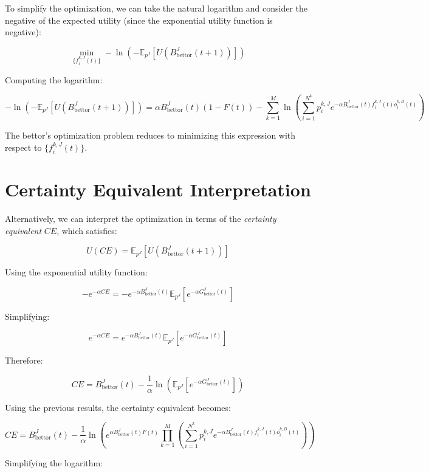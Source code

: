 To simplify the optimization, we can take the natural logarithm and consider the negative of the expected utility (since the exponential utility function is negative):

\[
\min_{\{ f_i^{k,J}(t) \}} -\ln\left( -\mathbb{E}_{p^{J}}\left[ U\left( B_{\text{bettor}}^J(t+1) \right) \right] \right)
\]

Computing the logarithm:

\[
-\ln\left( -\mathbb{E}_{p^{J}}\left[ U\left( B_{\text{bettor}}^J(t+1) \right) \right] \right) = \alpha B_{\text{bettor}}^J(t) (1 - F(t)) - \sum_{k=1}^M \ln\left( \sum_{i=1}^{N^k} p_i^{k,J} e^{ -\alpha B_{\text{bettor}}^J(t) f_i^{k,J}(t) o_i^{k,B}(t) } \right)
\]

The bettor's optimization problem reduces to minimizing this expression with respect to \( \{ f_i^{k,J}(t) \} \).

\section{Certainty Equivalent Interpretation}

Alternatively, we can interpret the optimization in terms of the \emph{certainty equivalent} \( CE \), which satisfies:

\[
U(CE) = \mathbb{E}_{p^{J}}\left[ U\left( B_{\text{bettor}}^J(t+1) \right) \right]
\]

Using the exponential utility function:

\[
-e^{ -\alpha CE } = -e^{ -\alpha B_{\text{bettor}}^J(t) } \mathbb{E}_{p^{J}}\left[ e^{ -\alpha G_{\text{bettor}}^J(t) } \right]
\]

Simplifying:

\[
e^{ -\alpha CE } = e^{ -\alpha B_{\text{bettor}}^J(t) } \mathbb{E}_{p^{J}}\left[ e^{ -\alpha G_{\text{bettor}}^J(t) } \right]
\]

Therefore:

\[
CE = B_{\text{bettor}}^J(t) - \frac{1}{\alpha} \ln\left( \mathbb{E}_{p^{J}}\left[ e^{ -\alpha G_{\text{bettor}}^J(t) } \right] \right)
\]

Using the previous results, the certainty equivalent becomes:

\[
CE = B_{\text{bettor}}^J(t) - \frac{1}{\alpha} \ln\left( e^{ \alpha B_{\text{bettor}}^J(t) F(t) } \prod_{k=1}^M \left( \sum_{i=1}^{N^k} p_i^{k,J} e^{ -\alpha B_{\text{bettor}}^J(t) f_i^{k,J}(t) o_i^{k,B}(t) } \right) \right)
\]

Simplifying the logarithm:

